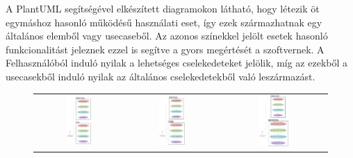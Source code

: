 A PlantUML segítségével elkészített diagramokon látható, hogy létezik öt egymáshoz hasonló működésű használati eset, így ezek származhatnak egy általános elemből vagy usecaseből.
Az azonos színekkel jelölt esetek hasonló funkcionalitást jeleznek ezzel is segítve a gyors megértését a szoftvernek.
A Felhasználóból induló nyilak a lehetséges cselekedeteket jelölik, míg az ezekből a usecasekből induló nyilak az általános cselekedetekből való leszármazást. 

\pagebreak

\begin{figure}[!ht]
    \centering
    \begin{tabular}{ccc} %
        \includegraphics[width=0.30\textwidth, height=0.4\textheight]{figures/Point Diagram.png} & 
        \includegraphics[width=0.30\textwidth, height=0.4\textheight]{figures/Topic Diagram.png} & 
        \includegraphics[width=0.30\textwidth, height=0.4\textheight]{figures/TrueFalseQuestion Diagram.png} \\
        

\end{tabular}
\end{figure}
